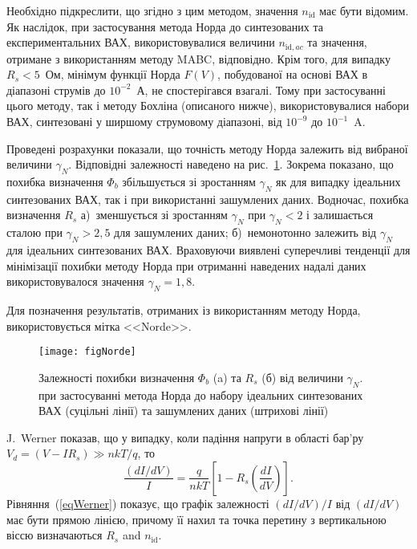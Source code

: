 Необхідно підкреслити, що згідно з цим методом, значення $n_\mathrm{id}$ має бути відомим.
Як наслідок, при застосування метода Норда до синтезованих та експериментальних ВАХ, використовувалися величини $n_{\mathrm{id},ac}$ та значення, отримане з використанням методу MABC, відповідно.
Крім того, для випадку  $R_s<5$~Ом, мінімум функції Норда $F(V)$, побудованої на основі ВАХ в діапазоні струмів до $10^{-2}$~А, не спостерігався взагалі.
Тому при застосуванні цього методу, так і методу Бохліна (описаного нижче), використовувалися набори ВАХ, синтезовані у ширшому струмовому діапазоні, від $10^{-9}$ до $10^{-1}$~A.

Проведені розрахунки показали, що точність методу Норда залежить від вибраної величини $\gamma_N$.
Відповідні залежності наведено на рис.~\ref{figNorde}.
Зокрема показано, що похибка визначення $\Phi_b$ збільшується зі зростанням $\gamma_N$ як для випадку ідеальних синтезованих ВАХ, так і при використанні зашумлених даних.
Водночас, похибка визначення  $R_s$
а)~зменшується зі зростанням $\gamma_N$ при $\gamma_N<2$ і залишається сталою при $\gamma_N>2,5$ для зашумлених даних;
б)~немонотонно залежить від $\gamma_N$ для ідеальних синтезованих ВАХ.
Враховуючи виявлені суперечливі тенденції для мінімізації похибки методу Норда при отриманні наведених надалі даних використовувалося значення $\gamma_N=1,8$.

Для позначення результатів, отриманих із використанням методу Норда, використовується мітка <<Norde>>.

\begin{figure}
\center
\texttt{[image: figNorde]}%
\caption{\label{figNorde}
Залежності похибки визначення $\Phi_b$ (a) та $R_s$ (б)  від величини $\gamma_N$.
 при застосуванні метода Норда до набору ідеальних синтезованих ВАХ (суцільні лінії) та зашумлених даних (штрихові лінії)
}
\end{figure}

J.~Werner  \cite{Werner} показав, що у випадку, коли падіння напруги в області бар'ру $V_d=(V-IR_s)\gg nkT/q$, то
\begin{equation}
\label{eqWerner}
\frac{(dI/dV)}{I}=\frac{q}{nkT}\left[1-R_s\left(\frac{dI}{dV}\right)\right].
\end{equation}
Рівняння~(\ref{eqWerner}) показує, що графік  залежності   $(dI/dV)/I$  від $(dI/dV)$ має бути прямою лінією,
причому її нахил та точка перетину з вертикальною віссю визначаються $R_s$ and $n_\mathrm{id}$.

